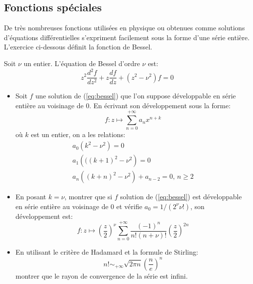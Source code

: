 \subsection{Fonctions spéciales}
De très nombreuses fonctions utilisées en physique ou obtenues comme solutions d'équations différentielles s'expriment facilement sous la forme d'une série entière. L'exercice ci-dessous définit la fonction de Bessel.
\begin{exercice}
Soit $\nu$ un entier. L'équation de Bessel d'ordre $\nu$ est:
\begin{equation}\label{eq:bessel}
z^2 \frac{d^2f}{dz^2} + z \frac{df}{dz} + \left(z^2-\nu^2\right)f = 0
\end{equation}
\begin{itemize}
\item Soit $f$ une solution de (\ref{eq:bessel}) que l'on suppose développable en série entière au voisinage de $0$. En écrivant son développement sous la forme:
\[
f \colon z \mapsto \sum_{n=0}^{+\infty} a_n x^{n+k}
\]
où $k$ est un entier, on a les relations:
\begin{eqnarray}
a_0 \left(k^2 - \nu^2\right) = 0 \\
a_1 \left(((k+1)^2 - \nu^2\right) = 0 \\
a_n \left((k+n)^2 - \nu^2\right) + a_{n-2} = 0, \, n \geq 2
\end{eqnarray}
\item En posant $k = \nu$, montrer que si $f$ solution de (\ref{eq:bessel}) est développable en série entière au voisinage de $0$ et vérifie $a_0=1/(2^\nu \nu!)$, son développement est:
\[
f \colon z \mapsto \left(\frac{z}{2}\right)^\nu \sum_{n=0}^{+\infty} \frac{(-1)^n}{n!(n+\nu)!}\left(\frac{z}{2}\right)^{2n}
\]
\item En utilisant le critère de Hadamard et la formule de Stirling:
\[
n! \sim_{+\infty} \sqrt{2 \pi n}\left(\frac{n}{e}\right)^n
\]
montrer que le rayon de convergence de la série est infini.
\end{itemize}
\end{exercice}
